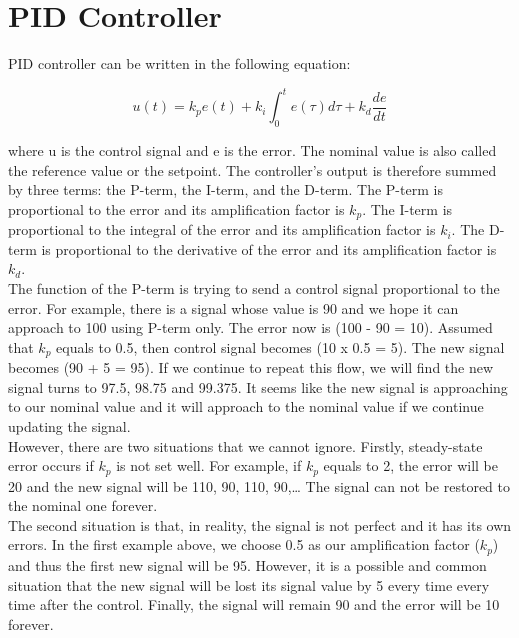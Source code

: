 \documentclass{report}
\begin{document}
\section{PID Controller} %
PID controller can be written in the following equation:

\begin{equation} \label{eq3}
 u(t) = k_p e(t) + k_i \int_{0}^{t} e(\tau) d\tau + k_d \frac{d e}{d t}
\end{equation}

 where u is the control signal and e is the error. The nominal value is also called the reference value or the setpoint. The controller’s output is therefore summed by three terms: the P-term, the I-term, and the D-term. The P-term is proportional to the error and its amplification factor is $k_p$. The I-term is proportional to the integral of the error and its amplification factor is $k_i$. The D-term is proportional to the derivative of the error and its amplification factor is $k_d$.\\
 
 The function of the P-term is trying to send a control signal proportional to the error. For example, there is a signal whose value is 90 and we hope it can approach to 100 using P-term only. The error now is (100 - 90 = 10). Assumed that $k_p$ equals to 0.5, then control signal becomes (10 x 0.5 = 5). The new signal becomes (90 + 5 = 95). If we continue to repeat this flow, we will find the new signal turns to 97.5, 98.75 and 99.375. It seems like the new signal is approaching to our nominal value and it will approach to the nominal value if we continue updating the signal.\\
 

However, there are two situations that we cannot ignore. Firstly, steady-state error occurs if $k_p$ is not set well. For example, if $k_p$ equals to 2, the error will be 20 and the new signal will be 110, 90, 110, 90,… The signal can not be restored to the nominal one forever. \\

The second situation is that, in reality, the signal is not perfect and it has its own errors. In the first example above, we choose 0.5 as our amplification factor ($k_p$) and thus the first new signal will be 95. However, it is a possible and common situation that the new signal will be lost its signal value by 5 every time every time after the control. Finally, the signal will remain 90 and the error will be 10 forever. \\
\end{document}
